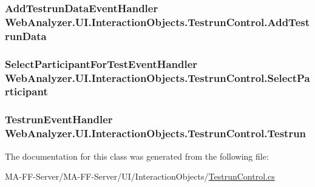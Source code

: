 \subsubsection[{Add\+Testrun\+Data}]{\setlength{\rightskip}{0pt plus 5cm}Add\+Testrun\+Data\+Event\+Handler Web\+Analyzer.\+U\+I.\+Interaction\+Objects.\+Testrun\+Control.\+Add\+Testrun\+Data}\label{class_web_analyzer_1_1_u_i_1_1_interaction_objects_1_1_testrun_control_ae68ced3ba48613d9aa1469c128e62419}
\hypertarget{class_web_analyzer_1_1_u_i_1_1_interaction_objects_1_1_testrun_control_abf256e52c1a039ca329f7c749a9087e4}{}
\subsubsection[{Select\+Participant}]{\setlength{\rightskip}{0pt plus 5cm}Select\+Participant\+For\+Test\+Event\+Handler Web\+Analyzer.\+U\+I.\+Interaction\+Objects.\+Testrun\+Control.\+Select\+Participant}\label{class_web_analyzer_1_1_u_i_1_1_interaction_objects_1_1_testrun_control_abf256e52c1a039ca329f7c749a9087e4}
\hypertarget{class_web_analyzer_1_1_u_i_1_1_interaction_objects_1_1_testrun_control_aec90f2bc94369619608e0059453752d3}{}
\subsubsection[{Testrun}]{\setlength{\rightskip}{0pt plus 5cm}Testrun\+Event\+Handler Web\+Analyzer.\+U\+I.\+Interaction\+Objects.\+Testrun\+Control.\+Testrun}\label{class_web_analyzer_1_1_u_i_1_1_interaction_objects_1_1_testrun_control_aec90f2bc94369619608e0059453752d3}


The documentation for this class was generated from the following file\+:\begin{DoxyCompactItemize}
\item 
M\+A-\/\+F\+F-\/\+Server/\+M\+A-\/\+F\+F-\/\+Server/\+U\+I/\+Interaction\+Objects/\hyperlink{_testrun_control_8cs}{Testrun\+Control.\+cs}\end{DoxyCompactItemize}
